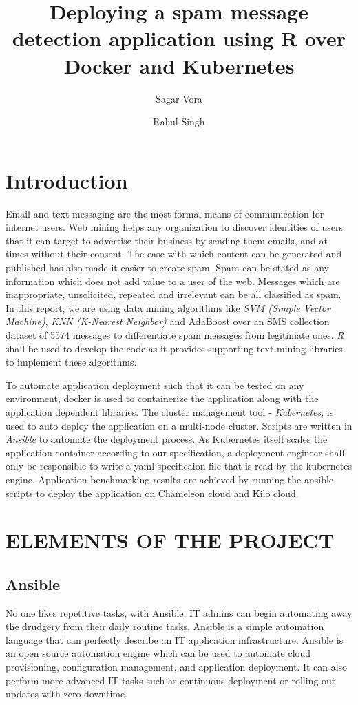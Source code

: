 \documentclass[9pt,twocolumn,twoside]{../../styles/osajnl}
\title{Deploying a spam message detection application using R over Docker and Kubernetes}
\author[1,*]{Sagar Vora}
\author[1]{Rahul Singh}
\affil[1]{School of Informatics and Computing, Bloomington, IN 47408, U.S.A.}
\affil[*]{Corresponding authors: vorasagar7@gmail.com, rahul\textunderscore singh919@yahoo.com}
\begin{document}
\maketitle

\section{Introduction}

Email and text messaging are the most formal means of communication
for internet users. Web mining helps any organization to discover
identities of users that it can target to advertise their business by
sending them emails, and at times without their consent. The ease with
which content can be generated and published has also made it easier
to create spam. Spam can be stated as any information which does not
add value to a user of the web. Messages which are inappropriate,
unsolicited, repeated and irrelevant can be all classified as spam. In
this report, we are using data mining algorithms like \emph{SVM
  (Simple Vector Machine)}, \emph{KNN (K-Nearest Neighbor)} and
AdaBoost over an SMS collection dataset of 5574 messages to
differentiate spam messages from legitimate ones. \emph{R} shall be
used to develop the code as it provides supporting text mining
libraries to implement these algorithms.

\noindent

To automate application deployment such that it can be tested on any
environment, docker is used to containerize the application along with
the application dependent libraries. The cluster management tool -
\emph{Kubernetes}, is used to auto deploy the application on a
multi-node cluster. Scripts are written in \emph{Ansible}
\cite{www-ansible} to automate the deployment process. As Kubernetes
itself scales the application container according to our
specification, a deployment engineer shall only be responsible to
write a yaml specificaion file that is read by the kubernetes
engine. Application benchmarking results are achieved by running the
ansible scripts to deploy the application on Chameleon cloud and Kilo
cloud.


\section{ELEMENTS OF THE PROJECT}

\subsection{Ansible}
No one likes repetitive tasks, with Ansible, IT
admins can begin automating away the drudgery from their daily routine
tasks. Ansible is a simple automation language that can perfectly
describe an IT application infrastructure. Ansible is an open source
automation engine which can be used to automate cloud provisioning,
configuration management, and application deployment. It can also
perform more advanced IT tasks such as continuous deployment or
rolling out updates with zero downtime.
\end{document}
